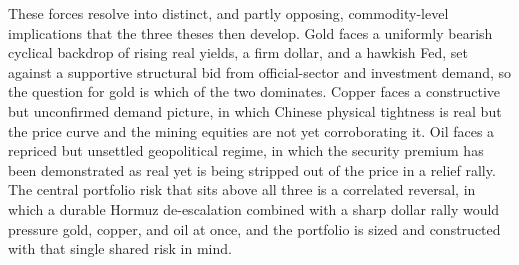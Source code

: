 \documentclass[11pt,a4paper]{article}
\begin{document}
These forces resolve into distinct, and partly opposing, commodity-level implications that the three theses then develop. Gold faces a uniformly bearish cyclical backdrop of rising real yields, a firm dollar, and a hawkish Fed, set against a supportive structural bid from official-sector and investment demand, so the question for gold is which of the two dominates. Copper faces a constructive but unconfirmed demand picture, in which Chinese physical tightness is real but the price curve and the mining equities are not yet corroborating it. Oil faces a repriced but unsettled geopolitical regime, in which the security premium has been demonstrated as real yet is being stripped out of the price in a relief rally. The central portfolio risk that sits above all three is a correlated reversal, in which a durable Hormuz de-escalation combined with a sharp dollar rally would pressure gold, copper, and oil at once, and the portfolio is sized and constructed with that single shared risk in mind.
\end{document}

